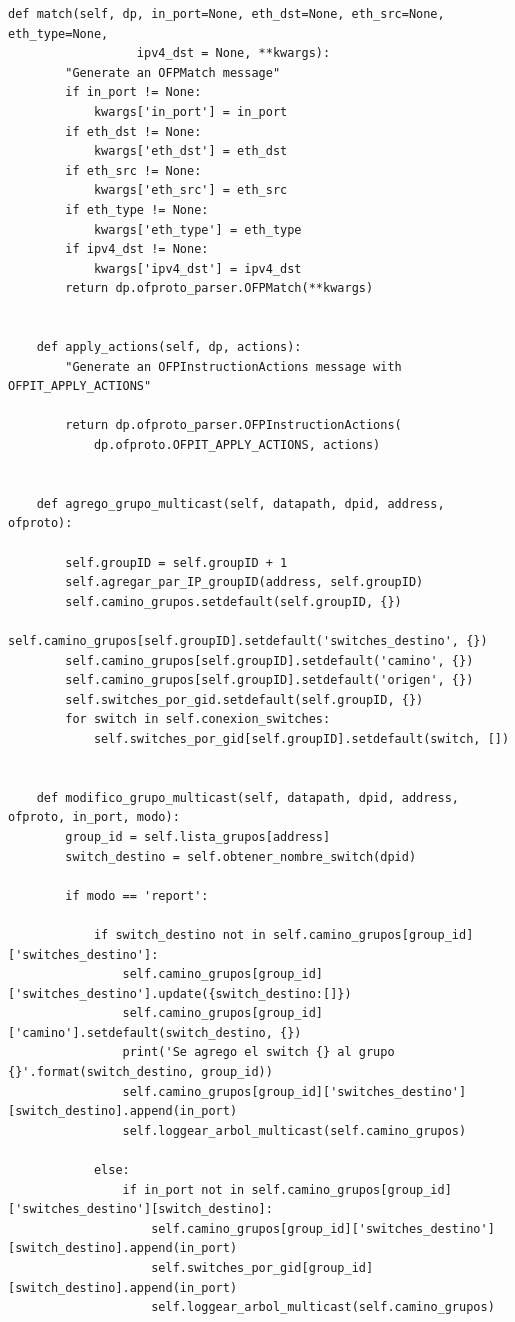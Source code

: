 \documentclass[12pt,a4paper,oneside]{book}
\begin{document}
\begin{lstlisting}[style=codigobase,  label = cod_correrP, caption= controlador.py]
    def match(self, dp, in_port=None, eth_dst=None, eth_src=None, eth_type=None,
                  ipv4_dst = None, **kwargs):
        "Generate an OFPMatch message"
        if in_port != None:
            kwargs['in_port'] = in_port
        if eth_dst != None:
            kwargs['eth_dst'] = eth_dst
        if eth_src != None:
            kwargs['eth_src'] = eth_src
        if eth_type != None:
            kwargs['eth_type'] = eth_type
        if ipv4_dst != None:
            kwargs['ipv4_dst'] = ipv4_dst
        return dp.ofproto_parser.OFPMatch(**kwargs)


    def apply_actions(self, dp, actions):
        "Generate an OFPInstructionActions message with OFPIT_APPLY_ACTIONS"

        return dp.ofproto_parser.OFPInstructionActions(
            dp.ofproto.OFPIT_APPLY_ACTIONS, actions)


    def agrego_grupo_multicast(self, datapath, dpid, address, ofproto):

        self.groupID = self.groupID + 1
        self.agregar_par_IP_groupID(address, self.groupID)
        self.camino_grupos.setdefault(self.groupID, {})
        self.camino_grupos[self.groupID].setdefault('switches_destino', {})
        self.camino_grupos[self.groupID].setdefault('camino', {})
        self.camino_grupos[self.groupID].setdefault('origen', {})
        self.switches_por_gid.setdefault(self.groupID, {})
        for switch in self.conexion_switches:
            self.switches_por_gid[self.groupID].setdefault(switch, [])


    def modifico_grupo_multicast(self, datapath, dpid, address, ofproto, in_port, modo):
        group_id = self.lista_grupos[address]
        switch_destino = self.obtener_nombre_switch(dpid)

        if modo == 'report':

            if switch_destino not in self.camino_grupos[group_id]['switches_destino']:
                self.camino_grupos[group_id]['switches_destino'].update({switch_destino:[]})
                self.camino_grupos[group_id]['camino'].setdefault(switch_destino, {})
                print('Se agrego el switch {} al grupo {}'.format(switch_destino, group_id))
                self.camino_grupos[group_id]['switches_destino'][switch_destino].append(in_port)
                self.loggear_arbol_multicast(self.camino_grupos)

            else:
                if in_port not in self.camino_grupos[group_id]['switches_destino'][switch_destino]:
                    self.camino_grupos[group_id]['switches_destino'][switch_destino].append(in_port)
                    self.switches_por_gid[group_id][switch_destino].append(in_port)
                    self.loggear_arbol_multicast(self.camino_grupos)


\end{lstlisting}
\end{document}
